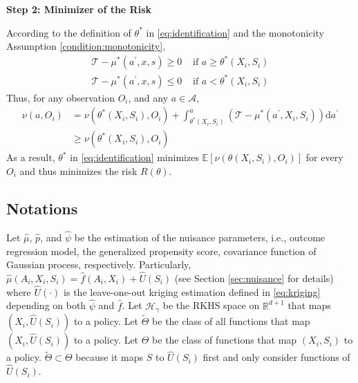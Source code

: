 \documentclass[12pt]{article}
\newcommand{\E}{\mathbb{E}}
\newcommand{\R}{\mathbb{R}}
\begin{document}
\noindent \textbf{Step 2: Minimizer of the Risk}

\noindent According to the definition of $\theta^*$ in \eqref{eq:identification} and the monotonicity Assumption \ref{condition:monotonicity},
\begin{align*}
    \mathcal{T} - \mu^*(a^\prime, x, s) \geq 0 &\text{ if } a\geq \theta^*(X_i,S_i)\\
    \mathcal{T} - \mu^*(a^\prime, x, s) \leq 0 &\text{ if } a< \theta^*(X_i,S_i)
\end{align*}
Thus, for any observation $O_i$, and any $a\in \mathcal{A}$,
\begin{align*}
   \nu(a,O_i)& = \nu(\theta^*(X_i,S_i),O_i) +
   \int_{\theta^*(X_i,S_i)}^{a} \left( \mathcal{T} - \mu^*(a^\prime, X_i, S_i) \right)  \mathrm{d}a^\prime\\
   &\geq \nu(\theta^*(X_i,S_i),O_i)
\end{align*}
As a result, $\theta^*$ in \eqref{eq:identification} minimizes $\E[\nu(\theta(X_i,S_i),O_i)]$ for every $O_i$ and thus minimizes the risk $R(\theta)$.




\subsection{Notations}\label{sec:supp_notations}
Let $\widehat\mu$, $\widehat p$, and $\widehat\psi$ be the estimation of the nuisance parameters, i.e., outcome regression model, the generalized propensity score, covariance function of Gaussian process, respectively. Particularly, $\widehat\mu (A_i,X_i,S_i) = \widehat f(A_i,X_i) +\widehat U(S_i)$ (see Section \ref{sec:nuisance} for details) where $\widehat U(\cdot)$ is the leave-one-out kriging estimation defined in \eqref{eq:kriging} depending on both $\widehat\psi$ and $\widehat f$. Let $\mathcal{H}_\gamma$ be the RKHS space on $\R^{d+1}$ that maps $(X_i,\widehat U(S_i))$ to a policy. Let $\widetilde\Theta$ be the class of all functions that map $(X_i,\widehat U(S_i))$ to a policy. Let $\Theta$ be the class of functions that map $(X_i,S_i)$ to a policy. $\widetilde\Theta\subset \Theta$ because it maps $S$ to $\widehat U(S_i)$ first and only consider functions of $\widehat U(S_i)$. 
\end{document}
